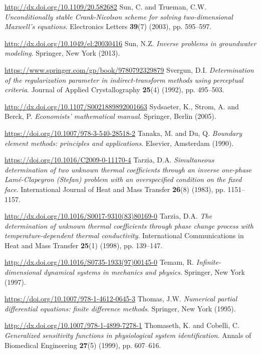\begin{thebibliography}{301}
\url{http://dx.doi.org/10.1109/20.582682}
%
%
 Sun, C. and Trueman, C.W. {\it Unconditionally stable Crank-Nicolson scheme for solving two-dimensional Maxwell's equations}. Electronics Letters {\bf 39}(7) (2003), pp. 595--597.

\url{http://dx.doi.org/10.1049/el:20030416}
%
%
 Sun, N.Z. {\it Inverse problems in groundwater modeling}. Springer, New York (2013).

\url{https://www.springer.com/gp/book/9780792329879}
%
%
 Svergun, D.I. {\it Determination of the regularization parameter in indirect-transform methods using perceptual criteria}. Journal of Applied Crystallography {\bf 25}(4) (1992), pp. 495--503.

\url{http://dx.doi.org/10.1107/S0021889892001663}
%
%
 Sydsaeter, K., Strom, A. and Berck, P. {\it Economists' mathematical manual}. Springer, Berlin (2005).

\url{https://doi.org/10.1007/978-3-540-28518-2}
%
%
 Tanaka, M. and Du, Q. {\it Boundary element methods: principles and applications}. Elsevier, Amsterdam (1990).

\url{https://doi.org/10.1016/C2009-0-11170-4}
%
%
 Tarzia, D.A. {\it Simultaneous determination of two unknown thermal coefficients through an inverse one-phase Lam\'e-Clapeyron (Stefan) problem with an overspecified condition on the fixed face}. International Journal of Heat and Mass Transfer {\bf 26}(8) (1983), pp. 1151--1157.

\url{http://dx.doi.org/10.1016/S0017-9310(83)80169-0}
%
%
 Tarzia, D.A. {\it The determination of unknown thermal coefficients through phase change process with temperature-dependent thermal conductivity}. International Communications in Heat and Mass Transfer {\bf 25}(1) (1998), pp. 139--147.

\url{http://dx.doi.org/10.1016/S0735-1933(97)00145-0}
%
%
 Temam, R. {\it Infinite-dimensional dynamical systems in mechanics and physics}. Springer, New York (1997).

\url{https://doi.org/10.1007/978-1-4612-0645-3}
%
%
 Thomas, J.W. {\it Numerical partial differential equations: finite difference methods}. Springer, New York (1995).

\url{http://dx.doi.org/10.1007/978-1-4899-7278-1}
%
%
 Thomaseth, K. and Cobelli, C. {\it Generalized sensitivity functions in physiological system identification}. Annals of Biomedical Engineering {\bf 27}(5) (1999), pp. 607--616.


\end{thebibliography}
